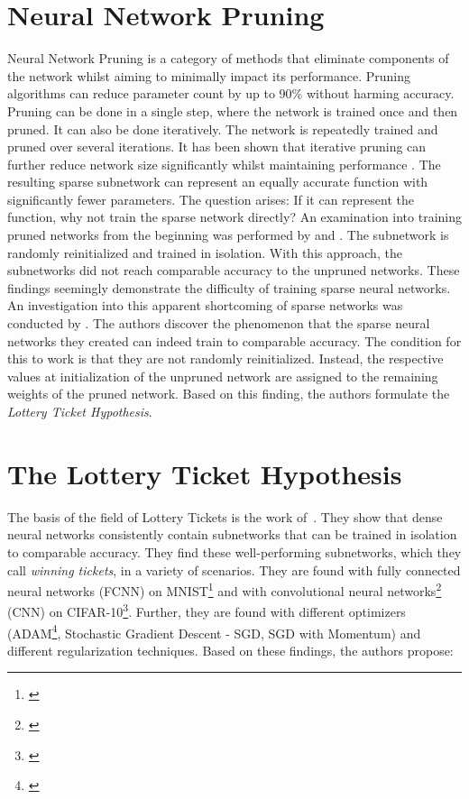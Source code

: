 \section{Neural Network Pruning}
Neural Network Pruning is a category of methods that eliminate components of the network whilst aiming to minimally impact its performance.
Pruning algorithms can reduce parameter count by up to 90\% without harming accuracy.
\autocite{LeCun, OptimalBrainSurgeon, HanEtAl15, PruningFiltersForEfficientConvets}
Pruning can be done in a single step, where the network is trained once and then pruned.
It can also be done iteratively. 
The network is repeatedly trained and pruned over several iterations. 
It has been shown that iterative pruning can further reduce network size significantly whilst maintaining performance \autocite{HanEtAl15}.
The resulting sparse subnetwork can represent an equally accurate function with significantly fewer parameters. 
The question arises: If it can represent the function, why not train the sparse network directly?
An examination into training pruned networks from the beginning was performed by \textcite{PruningFiltersForEfficientConvets} and \textcite{HanEtAl15}.
The subnetwork is randomly reinitialized and trained in isolation.
With this approach, the subnetworks did not reach comparable accuracy to the unpruned networks.
These findings seemingly demonstrate the difficulty of training sparse neural networks.
An investigation into this apparent shortcoming of sparse networks was conducted by \textcite{LTH}.
The authors discover the phenomenon that the sparse neural networks they created can indeed train to comparable accuracy.
The condition for this to work is that they are not randomly reinitialized. 
Instead, the respective values at initialization of the unpruned network are assigned to the remaining weights of the pruned network. 
Based on this finding, the authors formulate the \textit{Lottery Ticket Hypothesis}.

\section{The Lottery Ticket Hypothesis}
The basis of the field of Lottery Tickets is the work of~\cite{LTH}. 
They show that dense neural networks consistently contain subnetworks that can be trained in isolation to comparable accuracy.
They find these well-performing subnetworks, which they call \textit{winning tickets}, in a variety of scenarios.
They are found with fully connected neural networks (FCNN) on MNIST\footnote{\cite{mnist}} and with convolutional neural networks\footnote{\cite{cnn}} (CNN)  on CIFAR-10\footnote{\cite{cifar}}.
Further, they are found with different optimizers (ADAM\footnote{\cite{ADAM}}, Stochastic Gradient Descent - SGD, SGD with Momentum) and different regularization techniques.
Based on these findings, the authors propose:


